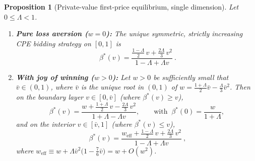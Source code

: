 \documentclass[11pt,a4paper]{article}
\newtheorem{proposition}{Proposition}
\theoremstyle{remark}
\begin{document}
\begin{proposition}[Private-value first-price equilibrium, single dimension]
\label{prop:pv}
Let $0\le\Lambda<1$.
\begin{enumerate}
\item[(i)] \textbf{Pure loss aversion ($w=0$):} The unique symmetric, strictly
increasing CPE bidding strategy on $[0,1]$ is
\begin{equation}
\boxed{\ \beta^{*}(v)=\frac{\tfrac{1-\Lambda}{2}\,v+\tfrac{2\Lambda}{3}\,v^{2}}
{1-\Lambda+\Lambda v}\ }.
\label{eq:pv_w0}
\end{equation}
\item[(ii)] \textbf{With joy of winning ($w>0$):} Let $w>0$ be sufficiently small
that $\bar v\in(0,1)$, where $\bar v$ is the unique root in $(0,1)$ of
$w=\tfrac{1+\Lambda}{2}\bar v-\tfrac{\Lambda}{3}\bar v^{2}$. Then on the boundary
layer $v\in[0,\bar v]$ (where $\beta^{*}(v)\ge v$),
\begin{equation}
\beta^{*}(v)=\frac{w+\tfrac{1+\Lambda}{2}\,v-\tfrac{2\Lambda}{3}\,v^{2}}
{1+\Lambda-\Lambda v},
\qquad \text{with }\ \beta^{*}(0)=\frac{w}{1+\Lambda},
\label{eq:pv_bl}
\end{equation}
and on the interior $v\in[\bar v,1]$ (where $\beta^{*}(v)\le v$),
\begin{equation}
\boxed{\ \beta^{*}(v)=\frac{w_{\mathrm{eff}}+\tfrac{1-\Lambda}{2}\,v+\tfrac{2\Lambda}{3}\,v^{2}}
{1-\Lambda+\Lambda v}\ },
\label{eq:pv_int}
\end{equation}
where $w_{\mathrm{eff}}\equiv w+\Lambda\bar v^{2}\big(1-\tfrac{7}{6}\bar v\big)=w+O(w^{2})$.
\end{enumerate}
\end{proposition}
\end{document}
